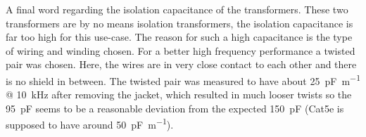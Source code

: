 \documentclass[12pt]{book}
\begin{document}
A final word regarding the isolation capacitance of the transformers. These two transformers are by no means isolation transformers, the isolation capacitance is far too high for this use-case. The reason for such a high capacitance is the type of wiring and winding chosen. For a better high frequency performance a twisted pair was chosen. Here, the wires are in very close contact to each other and there is no shield in between. The twisted pair was measured to have about \qty{25}{\pF \per \meter} @ \qty{10}{\kHz} after removing the jacket, which resulted in much looser twists so the \qty{95}{\pF} seems to be a reasonable deviation from the expected \qty{150}{\pF} (Cat5e is supposed to have around \qty{50}{\pF \per \m}).
\end{document}
